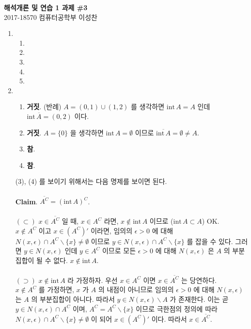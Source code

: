 \documentclass[12pt]{report}
\newcommand{\numl}[1]{\item[\large\textbf{\sffamily #1.}]}
\newcommand{\inte}{\mathrm{int}\,}
\newcommand{\bs}{\backslash}
\begin{document}
\begin{center}
\textbf{\Large 해석개론 및 연습 1 과제 \#3}\\
\large 2017-18570 컴퓨터공학부 이성찬
\end{center}
\begin{enumerate}
\numl{1}
\begin{enumerate}
	\item[(1)]
	\item[(2)]
	\item[(3)]
	\item[(4)]
	\item[(5)]
\end{enumerate}

\numl{2}
\begin{enumerate}
	\item[(1)] \textbf{거짓}. (반례) $A = (0, 1)\cup (1, 2)$ 를 생각하면 $\inte A = A$ 인데 $\inte\overline{A} = (0, 2)$ 이다.
	\item[(2)] \textbf{거짓}. $A = \{0\}$ 을 생각하면 $\inte A = \emptyset$ 이므로 $\overline{\inte A} = \emptyset \neq A$. 
	\item[(3)] \textbf{참}.
	\item[(4)] \textbf{참}.
\end{enumerate}
(3), (4) 를 보이기 위해서는 다음 명제를 보이면 된다.\\
\\
\textbf{Claim}. $\overline{A^C} = (\inte A)^C$.\\
\\
$(\subset)$ $x\in \overline{A^C}$ 일 때, $x\in A^C$ 라면, $x\notin \inte A$ 이므로 ($\inte A \subset A$) OK.\\
$x\notin A^C$ 이고 $x\in (A^C)'$ 이라면, 임의의 $\epsilon>0$ 에 대해 $N(x, \epsilon) \cap A^C \bs \{x\}\neq \emptyset$ 이므로 $y\in N(x, \epsilon) \cap A^C \bs \{x\}$ 를 잡을 수 있다. 그러면 $y\in N(x, \epsilon)$ 인데 $y\in A^C$ 이므로 모든 $\epsilon>0$ 에 대해 $N(x, \epsilon)$ 은 $A$ 의 부분집합이 될 수 없다. $x\notin \inte A$.\\
\\
$(\supset)$ $x\notin \inte A$ 라 가정하자. 우선 $x\in A^C$ 이면 $x\in \overline{A^C}$ 는 당연하다.\\
$x\notin A^C$ 를 가정하면, $x$ 가 $A$ 의 내점이 아니므로 임의의 $\epsilon>0$ 에 대해 $N(x,\epsilon)$ 는 $A$ 의 부분집합이 아니다. 따라서 $y\in N(x, \epsilon) \bs A$ 가 존재한다. 이는 곧 $y\in N(x, \epsilon) \cap A^C$ 이며, $A^C = A^C \bs \{x\}$ 이므로 극한점의 정의에 따라 $N(x, \epsilon) \cap A^C\bs \{x\} \neq \emptyset$ 이 되어 $x\in (A^C)'$ 이다. 따라서 $x\in \overline{A^C}$. 


\end{enumerate}
\end{document}
